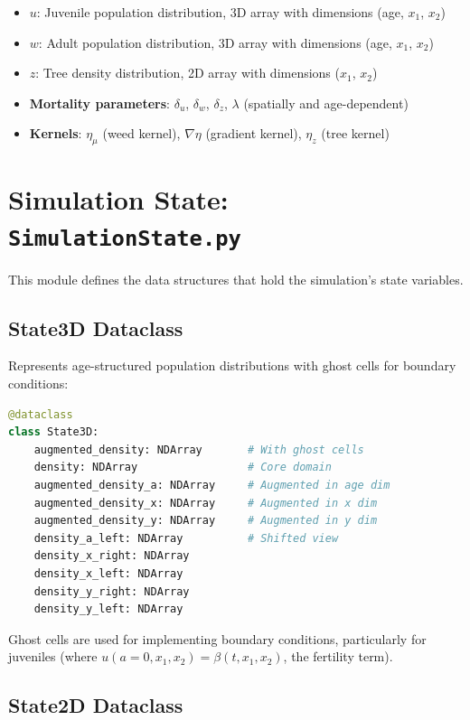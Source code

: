\documentclass[12pt,a4paper]{report}
\begin{document}
\begin{itemize}
    \item \textbf{$u$}: Juvenile population distribution, 3D array with dimensions (age, $x_1$, $x_2$)
    \item \textbf{$w$}: Adult population distribution, 3D array with dimensions (age, $x_1$, $x_2$)
    \item \textbf{$z$}: Tree density distribution, 2D array with dimensions ($x_1$, $x_2$)
    \item \textbf{Mortality parameters}: $\delta_u$, $\delta_w$, $\delta_z$, $\lambda$ (spatially and age-dependent)
    \item \textbf{Kernels}: $\eta_\mu$ (weed kernel), $\nabla\eta$ (gradient kernel), $\eta_z$ (tree kernel)
\end{itemize}

\section{Simulation State: \texttt{SimulationState.py}}

This module defines the data structures that hold the simulation's state variables.

\subsection{State3D Dataclass}

Represents age-structured population distributions with ghost cells for boundary conditions:

\begin{lstlisting}[language=Python]
@dataclass
class State3D:
    augmented_density: NDArray       # With ghost cells
    density: NDArray                 # Core domain
    augmented_density_a: NDArray     # Augmented in age dim
    augmented_density_x: NDArray     # Augmented in x dim
    augmented_density_y: NDArray     # Augmented in y dim
    density_a_left: NDArray          # Shifted view
    density_x_right: NDArray
    density_x_left: NDArray
    density_y_right: NDArray
    density_y_left: NDArray
\end{lstlisting}

Ghost cells are used for implementing boundary conditions, particularly for juveniles (where $u(a=0, x_1, x_2) = \beta(t, x_1, x_2)$, the fertility term).

\subsection{State2D Dataclass}
\end{document}
